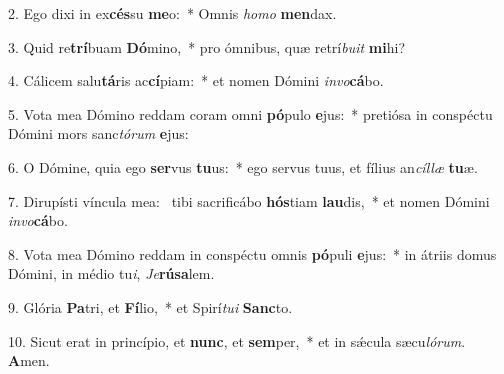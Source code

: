 2. Ego dixi in ex\textbf{cés}su \textbf{me}o:~*  Omnis \textit{ho}\textit{mo} \textbf{men}dax.\

3. Quid re\textbf{trí}buam \textbf{Dó}mino,~*  pro ómnibus, quæ retrí\textit{bu}\textit{it} \textbf{mi}hi?\

4. Cálicem salu\textbf{tá}ris ac\textbf{cí}piam:~*  et nomen Dómini \textit{in}\textit{vo}\textbf{cá}bo.\

5. Vota mea Dómino reddam coram omni \textbf{pó}pulo \textbf{e}jus:~*  pretiósa in conspéctu Dómini mors sanc\textit{tó}\textit{rum} \textbf{e}jus:\

6. O Dómine, quia ego \textbf{ser}vus \textbf{tu}us:~*  ego servus tuus, et fílius an\textit{cíl}\textit{læ} \textbf{tu}æ.\

7. Dirupísti víncula mea: \dag\  tibi sacrificábo \textbf{hós}tiam \textbf{lau}dis,~*  et nomen Dómini \textit{in}\textit{vo}\textbf{cá}bo.\

8. Vota mea Dómino reddam in conspéctu omnis \textbf{pó}puli \textbf{e}jus:~*  in átriis domus Dómini, in médio tu\textit{i}, \textit{Je}\textbf{rú}\textbf{sa}lem.\

9. Glória \textbf{Pa}tri, et \textbf{Fí}lio,~*  et Spirí\textit{tu}\textit{i} \textbf{Sanc}to.\

10. Sicut erat in princípio, et \textbf{nunc}, et \textbf{sem}per,~*  et in sǽcula sæcu\textit{ló}\textit{rum}. \textbf{A}men.\

